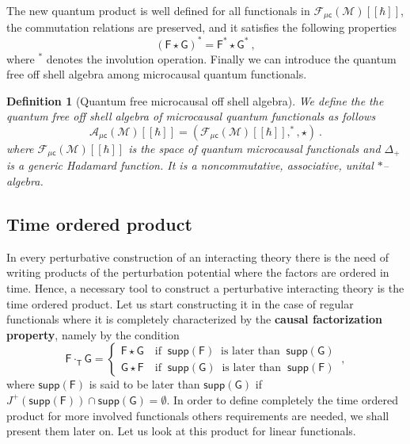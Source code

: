 \documentclass[11pt]{book}
\newcommand{\supp}{\mathsf{supp}}
\newcommand{\muc}{\mu\csf}
\newcommand{\Acal}{\mathcal{A}}
\newcommand{\Fcal}{\mathcal{F}}
\newcommand{\Mcal}{\mathcal{M}}
\newcommand{\Fsf}{\mathsf{F}}
\newcommand{\Gsf}{\mathsf{G}}
\newcommand{\Tsf}{\mathsf{T}}
\newcommand{\csf}{\mathsf{c}}
\theoremstyle{break}
\newtheorem{definition}{Definition}[chapter]
\begin{document}
\bigskip


The new quantum product is well defined for all functionals in $\Fcal_{\muc}(\Mcal)[[\hbar]]$, the commutation relations are preserved, and it satisfies the following properties
%
\begin{equation*}
\left(\Fsf \star \Gsf\right)^\ast = \Fsf^\ast \star \Gsf^\ast \ ,
\end{equation*}
%
where $^\ast$ denotes the involution operation. Finally we can introduce the quantum free off shell algebra among microcausal quantum functionals.


\begin{definition}[Quantum free microcausal off shell algebra]\label{def:alg_q_muc}
We define the the quantum free off shell algebra of microcausal quantum functionals as follows
%
\begin{equation*}
\Acal_{\muc}(\Mcal)[[\hbar]] = \left(\Fcal_{\muc}(\Mcal)[[\hbar]] , ^\ast , \star \right) \ . 
\end{equation*}
%
where $\Fcal_{\muc}(\Mcal)[[\hbar]]$ is the space of quantum microcausal functionals and $\Delta_+$ is a generic Hadamard function. It is a noncommutative, associative, unital $\ast$--algebra. 
\end{definition}


\subsection{Time ordered product}
\label{p:PROD_TIME}


In every perturbative construction of an interacting theory there is the need of writing products of the perturbation potential where the factors are ordered in time. Hence, a necessary tool to construct a perturbative interacting theory is the time ordered product. Let us start constructing it in the case of regular functionals where it is completely characterized by the \textbf{causal factorization property}, namely by the condition
%
\begin{equation}
\Fsf \cdot_\Tsf \Gsf = 
\left\{
\begin{array}{ll}
\Fsf \star \Gsf \quad \mbox{if } \ \supp(\Fsf) \ \mbox{ is later than  } \ \supp(\Gsf)  \\
\Gsf \star \Fsf \quad \mbox{if } \ \supp(\Gsf) \ \mbox{ is later than  } \ \supp(\Fsf) 
\end{array}
\right. \ ,
\label{eq:causal_factorization}
\end{equation}
%
where $\supp(\Fsf)$ is said to be  later than   $\supp(\Gsf)$ if $J^+(\supp(\Fsf)) \cap \supp(\Gsf)=\emptyset$. 
%
In order to define completely the time ordered product for more involved functionals others requirements are needed, we shall present them later on.
%
Let us look at this product for linear functionals.
\end{document}
